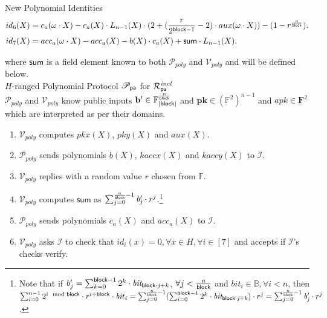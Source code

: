 \noindent \textsf{New Polynomial Identities} 
\begin{align*}
id_6(X) & =  c_{a}(\omega \cdot X) - c_{a}(X) \cdot L_{n-1}(X) \cdot (2+ (\frac{r}{2^{\mathsf{block} -1}} -2)  \cdot aux(\omega \cdot X)) - (1 - r^{\frac{n}{\mathsf{block}}}). \\
id_7(X) & = acc_{a}(\omega \cdot X) - acc_{a}(X) - b(X)\cdot c_{a}(X) +  \mathsf{sum} \cdot L_{n-1}(X).
\end{align*}

\noindent where $\mathsf{sum}$ is a field element known to both $\mathcal{P}_{poly}$ and $\mathcal{V}_{poly}$ and will be defined below. \\ 

\noindent \textsf{$H$-ranged Polynomial Protocol $\mathscr{P}_{\mathsf{pa}}$ for $\mathcal{R}^{\mathit{incl}}_{\mathsf{pa}}$} \\


\noindent $\mathcal{P}_{poly}$ and $\mathcal{V}_{poly}$ know public inputs 
$\mathbf{b'} \in \mathbb{F}_{|\mathsf{block}|}^{\frac{n}{\mathsf{block}}}$ and 
$\mathbf{pk} \in (\mathbb{F}^2)^{n-1} $ and $\mathit{apk} \in \mathbf{F}^2$ which are interpreted as per their domains. 

\begin{enumerate}
\item $\mathcal{V}_{poly}$ computes $pkx(X)$, $pky(X)$ and $aux(X)$.
\item $\mathcal{P}_{poly}$ sends polynomials $b(X)$, $kaccx(X)$ and $kaccy(X)$ to $\mathcal{I}$. 
\item $\mathcal{V}_{poly}$ replies with a random value $r$ chosen from $\mathbb{F}$. 
\item $\mathcal{V}_{poly}$ computes $\mathsf{sum}$ as $\sum_{j=0}^{\frac{n}{\mathsf{block}}-1} \mathit{b'_{j}} \cdot r^j$.\footnote{Note that if 
$b'_{j} = \sum_{k=0}^{\mathsf{block} -1}2^k \cdot \mathit{bit_{\mathsf{block} \cdot j + k }}$, $\forall j < \frac{n}{\mathsf{block}}$ and $\mathit{bit_i} \in \mathbb{B}, \forall i <n$, 
then $\sum_{i=0}^{n-1} 2^{i \mod {\mathsf{block}}} \cdot r^{i \div \mathsf{block}} \cdot \mathit{bit}_{i} = \sum_{j=0}^{\frac{n}{\mathsf{block}}-1}(\sum_{i=0}^{\mathsf{block} -1}2^k \cdot \mathit{bit_{\mathsf{block} \cdot j + k }}) \cdot r^j= \sum_{j=0}^{\frac{n}{\mathsf{block}}-1} \mathit{b'_{j}} \cdot r^j$.}
\item $\mathcal{P}_{poly}$ sends polynomials $c_{a}(X)$ and $acc_{a}(X)$ to $\mathcal{I}$. 
\item $\mathcal{V}_{poly}$ asks $\mathcal{I}$ to check that $id_i(x) = 0, \forall x \in H, \forall i \in [7]$ and accepts if $\mathcal{I}$'s checks verify. 
\end{enumerate}

